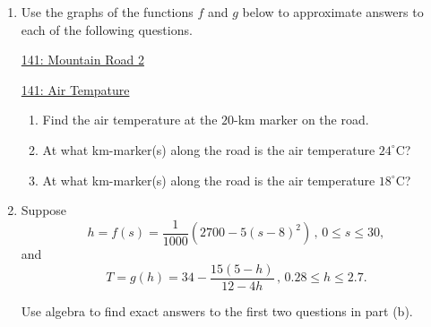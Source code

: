 \documentclass{ximera}
\newcommand{\pskip}{\vskip 0.1 in}
\begin{document}
\begin{example}
\begin{enumerate}
\item Use the graphs of the functions $f$ and $g$ below to approximate answers to each of the following questions.

\begin{onlineOnly}
    \begin{center}
\end{center}
\end{onlineOnly}

\href{https://www.desmos.com/calculator/vn9n75zwjx}{141: Mountain Road 2}

\begin{onlineOnly}
    \begin{center}
\end{center}
\end{onlineOnly}

\href{https://www.desmos.com/calculator/qfiqp5idzc}{141: Air Tempature}


\begin{enumerate}
\item Find the air temperature at the $20$-km marker on the road. %



\item At what km-marker(s) along the road is the air temperature $24^\circ$C? 

\item At what km-marker(s) along the road is the air temperature $18^\circ$C?



\end{enumerate}

\item Suppose
\[
    h = f(s) = \frac{1}{1000}\left( 2700 - 5(s-8)^2 \right) \, , \, 0\leq s \leq 30,
\]
and
\[
    T = g(h) = 34 - \frac{15(5-h)}{12-4h} \, , \, 0.28 \leq h \leq 2.7 .
\]

Use algebra to find exact answers to the first two questions in part (b).

\end{enumerate}
\end{example}
\end{document}
